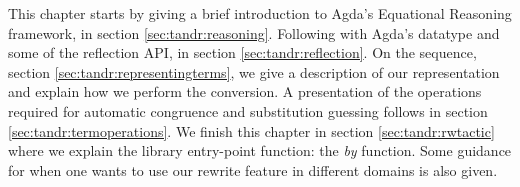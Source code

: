 This chapter starts by giving a brief introduction to Agda's Equational Reasoning framework, in section \ref{sec:tandr:reasoning}. Following with Agda's  datatype and some of the reflection API, in section \ref{sec:tandr:reflection}. 
On the sequence, section \ref{sec:tandr:representingterms}, we give a description of our  representation
and explain how we perform the conversion. A presentation of the operations required for 
automatic congruence and substitution guessing follows in section \ref{sec:tandr:termoperations}.
We finish this chapter in section \ref{sec:tandr:rwtactic} where we explain the library entry-point function: the \emph{by} function.
Some guidance for when one wants to use our rewrite feature in different domains is also given.
